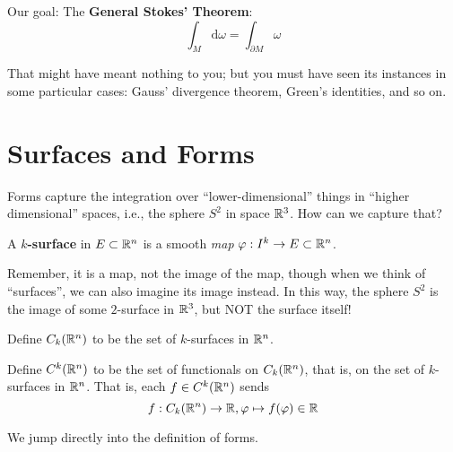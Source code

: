 \documentclass[a4paper, 11pt]{article}
\begin{document}
Our goal: The \textbf{General Stokes' Theorem}: \begin{equation*}
\int_M \mathrm{d} \omega = \int_{\partial M} \omega
\end{equation*}

That might have meant nothing to you; but you must have seen its instances in some particular cases: Gauss' divergence theorem, Green's identities, and so on.

\section{Surfaces and Forms}
Forms capture the integration over ``lower-dimensional'' things in ``higher dimensional'' spaces, i.e., the sphere $S^2$ in space $\mathbb{R}^3$. How can we capture that?
\begin{definition} 
    A $k$\textbf{-surface} in $E \subset \mathbb{R}^n$ is a smooth \textit{map} $\varphi: I^k \to E \subset \mathbb{R}^n$. 
    
    Remember, it is a map, not the image of the map, though when we think of ``surfaces'', we can also imagine its image instead. In this way, the sphere $S^2$ is the image of some $2$-surface in $\mathbb{R}^3$, but NOT the surface itself!

    Define $C_k(\mathbb{R}^n)$ to be the set of $k$-surfaces in $\mathbb{R}^n$.
\end{definition}

\begin{definition} 
    Define $C^k(\mathbb{R}^n)$ to be the set of functionals on $C_k(\mathbb{R}^n)$, that is, on the set of $k$-surfaces in $\mathbb{R}^n$. That is, each $f \in C^k(\mathbb{R}^n)$ sends \begin{equation*}
    f: C_k(\mathbb{R}^n) \to \mathbb{R}, \varphi \mapsto f(\varphi) \in \mathbb{R}
    \end{equation*}
\end{definition}

We jump directly into the definition of forms.
\end{document}
